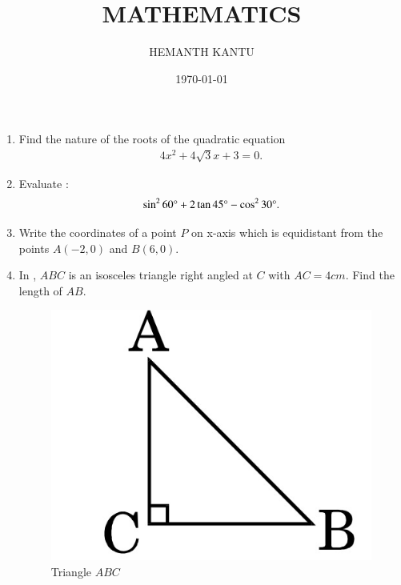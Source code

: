 \documentclass[12pt,-letter paper]{article}
\title{MATHEMATICS}
\author{HEMANTH KANTU}
\date{\today}
\providecommand{\brak}[1]{\ensuremath{\left(#1\right)}}
\begin{document}
\maketitle
\begin{enumerate}

\item Find the nature of the roots of the quadratic equation 
 \begin{align*}
 4x^2 + 4\sqrt{3}x +3= 0 .
 \end{align*}
\item Evaluate :
 \begin{align*}
	     \sin^{2}{60\degree} + 2\tan{45\degree} - \cos^{2}{30\degree}. 
      \end{align*}
     
\item Write the coordinates of a point $P$ on x-axis which is equidistant from the points $A\brak{- 2, 0}$ and $B\brak{6, 0}$.

 \item In  , $ABC$ is an isosceles triangle right angled at $C$ with $AC = 4 cm$. Find the length of $AB$.
\begin{figure}[H]
    \centering
    \includegraphics[width=\columnwidth]{img1.jpg}
    \caption{Triangle $ABC$}
    \label{fig:Fig_1}
\end{figure}


\end{enumerate}
\end{document}
